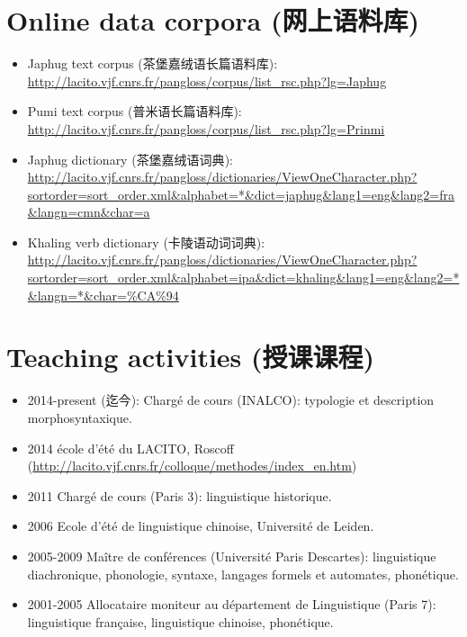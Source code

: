\documentclass[oldfontcommands,oneside,a4paper,11pt]{article}
\newcommand{\zh}[1]{{\cn #1}}
\newcommand{\lingua}[3]{#2 (\zh{#3})}
\begin{document}
\section*{\lingua{Corpus de données en ligne}{Online data corpora}{网上语料库}}
\begin{itemize}
\item \lingua{Textes japhug}{Japhug text corpus}{茶堡嘉绒语长篇语料库}: \url{http://lacito.vjf.cnrs.fr/pangloss/corpus/list\_rsc.php?lg=Japhug}
\item \lingua{Textes pumi}{Pumi text corpus}{普米语长篇语料库}: \url{http://lacito.vjf.cnrs.fr/pangloss/corpus/list_rsc.php?lg=Prinmi}
\item \lingua{Dictionnaire japhug}{Japhug dictionary}{茶堡嘉绒语词典}: \url{http://lacito.vjf.cnrs.fr/pangloss/dictionaries/ViewOneCharacter.php?sortorder=sort_order.xml&alphabet=*&dict=japhug&lang1=eng&lang2=fra&langn=cmn&char=a}
\item \lingua{Dictionnaire des verbes khaling}{Khaling verb dictionary}{卡陵语动词词典}: \url{http://lacito.vjf.cnrs.fr/pangloss/dictionaries/ViewOneCharacter.php?sortorder=sort_order.xml&alphabet=ipa&dict=khaling&lang1=eng&lang2=*&langn=*&char=\%CA\%94}
\end{itemize}
  
\section*{\lingua{Enseignement}{Teaching activities}{授课课程}}
\begin{itemize}
\item 2014-\lingua{présent}{present}{迄今}: Chargé de cours (INALCO): typologie et description morphosyntaxique.
\item 2014 école d'été du LACITO, Roscoff (\url{http://lacito.vjf.cnrs.fr/colloque/methodes/index\_en.htm})
\item 2011 Chargé de cours (Paris 3): linguistique historique.
\item  2006 Ecole d'été de linguistique chinoise, Université de Leiden.
\item 2005-2009 Maître de conférences (Université Paris Descartes): linguistique diachronique, phonologie, syntaxe, langages formels et automates, phonétique.
\item 2001-2005 Allocataire moniteur au département de Linguistique (Paris 7): linguistique française, linguistique chinoise, phonétique.
\end{itemize}
 
\end{document}
